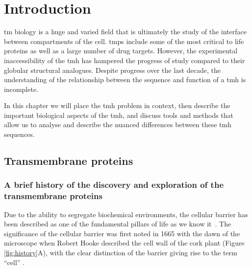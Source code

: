 \chapter{Introduction}
\sloppy
\gls{tm} biology is a huge and varied field that is ultimately the study of the interface between compartments of the cell.
\gls{tmp}s include some of the most critical to life proteins as well as a large number of drug targets.
However, the experimental inaccessibility of the \gls{tmh} has hampered the progress of study compared to their globular structural analogues.
Despite progress over the last decade, the understanding of the relationship between the sequence and function of a \gls{tmh} is incomplete.

In this chapter we will place the \gls{tmh} problem in context, then describe the important biological aspects of the \gls{tmh}, and discuss tools and methods that allow us to analyse and describe the nuanced differences between these \gls{tmh} sequences.

\section{Transmembrane proteins}

\subsection{A brief history of the discovery and exploration of the transmembrane proteins}

Due to the ability to segregate biochemical environments, the cellular barrier has been described as one of the fundamental pillars of life as we know it~\cite{Ladokhin2015}.
The significance of the cellular barrier was first noted in 1665 with the dawn of the microscope when Robert Hooke described the cell wall of the cork plant (Figure \ref{fig:history}A), with the clear distinction of the barrier giving rise to the term ``cell'' \cite{Donaldson2010, hooke1961micrographia}.


